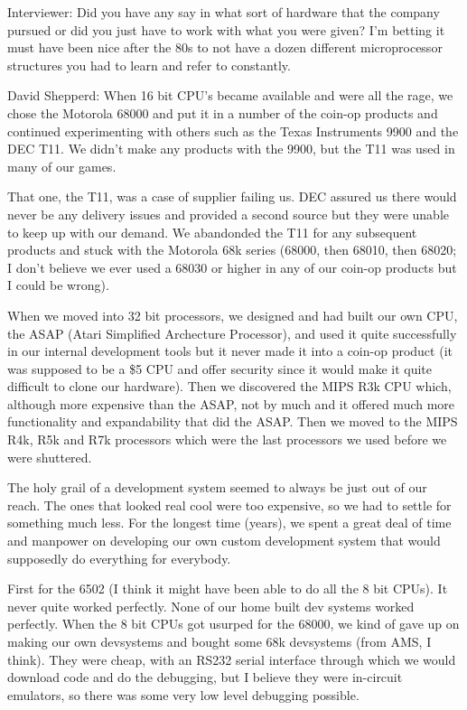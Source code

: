 \textcolor{interviewer}{Interviewer:} Did you have any say in what sort of hardware that the company pursued or did you just have to work with what you were given? I'm betting it must have been nice after the 80s to not have a dozen different microprocessor structures you had to learn and refer to constantly.

\textcolor{interviewee}{David Shepperd:} When 16 bit CPU's became available and were all the rage, we chose the Motorola 68000 and put it in a number of the coin-op products and continued experimenting with others such as the Texas Instruments 9900 and the DEC T11. We didn't make any products with the 9900, but the T11 was used in many of our games. 

That one, the T11, was a case of supplier failing us. DEC assured us there would never be any delivery issues and provided a second source but they were unable to keep up with our demand. We abandonded the T11 for any subsequent products and stuck with the Motorola 68k series (68000, then 68010, then 68020; I don't believe we ever used a 68030 or higher in any of our coin-op products but I could be wrong). 

When we moved into 32 bit processors, we designed and had built our own CPU, the ASAP (Atari Simplified Archecture Processor), and used it quite successfully in our internal development tools but it never made it into a coin-op product (it was supposed to be a \$5 CPU and offer security since it would make it quite difficult to clone our hardware). Then we discovered the MIPS R3k CPU which, although more expensive than the ASAP, not by much and it offered much more functionality and expandability that did the ASAP. Then we moved to the MIPS R4k, R5k and R7k processors which were the last processors we used before we were shuttered.

The holy grail of a development system seemed to always be just out of our reach. The ones that looked real cool were too expensive, so we had to settle for something much less. For the longest time (years), we spent a great deal of time and manpower on developing our own custom development system that would supposedly do everything for everybody. 

First for the 6502 (I think it might have been able to do all the 8 bit CPUs). It never quite worked perfectly. None of our home built dev systems worked perfectly. When the 8 bit CPUs got usurped for the 68000, we kind of gave up on making our own devsystems and bought some 68k devsystems (from AMS, I think). They were cheap, with an RS232 serial interface through which we would download code and do the debugging, but I believe they were in-circuit emulators, so there was some very low level debugging possible. 

